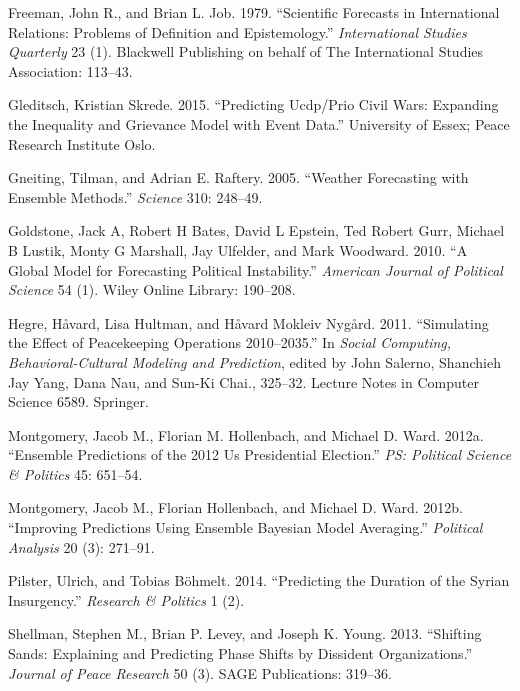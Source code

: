 \documentclass[]{article}
\begin{document}
\leavevmode\hypertarget{ref-freeman:job:1979}{}%
Freeman, John R., and Brian L. Job. 1979. ``Scientific Forecasts in
International Relations: Problems of Definition and Epistemology.''
\emph{International Studies Quarterly} 23 (1). Blackwell Publishing on
behalf of The International Studies Association: 113--43.

\leavevmode\hypertarget{ref-gleditsch:2015}{}%
Gleditsch, Kristian Skrede. 2015. ``Predicting Ucdp/Prio Civil Wars:
Expanding the Inequality and Grievance Model with Event Data.''
University of Essex; Peace Research Institute Oslo.

\leavevmode\hypertarget{ref-gneiting:raftery:2005}{}%
Gneiting, Tilman, and Adrian E. Raftery. 2005. ``Weather Forecasting
with Ensemble Methods.'' \emph{Science} 310: 248--49.

\leavevmode\hypertarget{ref-goldstone:etal:2010}{}%
Goldstone, Jack A, Robert H Bates, David L Epstein, Ted Robert Gurr,
Michael B Lustik, Monty G Marshall, Jay Ulfelder, and Mark Woodward.
2010. ``A Global Model for Forecasting Political Instability.''
\emph{American Journal of Political Science} 54 (1). Wiley Online
Library: 190--208.

\leavevmode\hypertarget{ref-hegre:etal:2011}{}%
Hegre, Håvard, Lisa Hultman, and Håvard Mokleiv Nygård. 2011.
``Simulating the Effect of Peacekeeping Operations 2010--2035.'' In
\emph{Social Computing, Behavioral-Cultural Modeling and Prediction},
edited by John Salerno, Shanchieh Jay Yang, Dana Nau, and Sun-Ki Chai.,
325--32. Lecture Notes in Computer Science 6589. Springer.

\leavevmode\hypertarget{ref-montgomery:etal:PS:2012}{}%
Montgomery, Jacob M., Florian M. Hollenbach, and Michael D. Ward. 2012a.
``Ensemble Predictions of the 2012 Us Presidential Election.'' \emph{PS:
Political Science \& Politics} 45: 651--54.

\leavevmode\hypertarget{ref-mhw:2012}{}%
Montgomery, Jacob M., Florian Hollenbach, and Michael D. Ward. 2012b.
``Improving Predictions Using Ensemble Bayesian Model Averaging.''
\emph{Political Analysis} 20 (3): 271--91.

\leavevmode\hypertarget{ref-pilster:bohmelt:2014}{}%
Pilster, Ulrich, and Tobias Böhmelt. 2014. ``Predicting the Duration of
the Syrian Insurgency.'' \emph{Research \& Politics} 1 (2).

\leavevmode\hypertarget{ref-shellman:etal:2013}{}%
Shellman, Stephen M., Brian P. Levey, and Joseph K. Young. 2013.
``Shifting Sands: Explaining and Predicting Phase Shifts by Dissident
Organizations.'' \emph{Journal of Peace Research} 50 (3). SAGE
Publications: 319--36.
\end{document}
